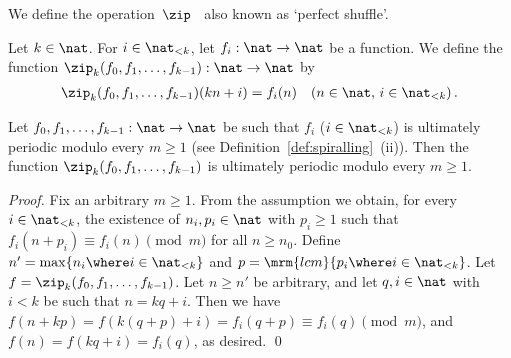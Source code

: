 We define the operation~$\zip$~\cite{grab:endr:hend:klop:moss:2012} also known as `perfect shuffle'.
 

\begin{definition}\label{def:zip}
  Let $k \in \nat$. 
  For $i \in \nat_{<k}$, 
  let $f_i : \nat \to \nat$ be a function.
  We define the function $\zip_k(f_0,f_1,\ldots,f_{k-1}) : \nat \to \nat$ by 
  \begin{align*}
    \zip_k(f_0,f_1,\ldots,f_{k-1})(kn+i) = f_i(n) && (n \in \nat,\, i \in \nat_{<k}) \,.
  \end{align*}
\end{definition}

\begin{lemma}\label{lem:zip:periodic:modulo}
  Let $f_0,f_1,\ldots,f_{k-1} : \nat \to \nat$ be 
  such that
  $f_i$ ($i \in \nat_{<k}$) is ultimately periodic modulo every $m \ge 1$ (see Definition~\ref{def:spiralling}~(ii)).
Then the function $\zip_k(f_0,f_1,\ldots,f_{k-1})$ is ultimately periodic modulo every $m \ge 1$.
\end{lemma}
\begin{proof}
  Fix an arbitrary $m \ge 1$.
  From the assumption we obtain, for every $i \in \nat_{<k}$, the existence of $n_i, p_i \in \nat$ with $p_i \ge 1$
  such that $f_i(n+p_i) \equiv f_i(n) \pmod{m}$ for all $n \ge n_0$.
  Define $n' = \max\{n_i\where i \in \nat_{<k}\}$
  and $p = \mrm{lcm} \{p_i\where i \in \nat_{<k}\}$.
  Let $f = \zip_k(f_0,f_1,\ldots,f_{k-1})$.
  Let $n \ge n'$ be arbitrary, 
  and let $q,i\in\nat$ with $i < k$ be such that $n = kq + i$.
  Then we have 
  $f(n+kp) = f(k(q+p) + i) = f_i(q+p) \equiv f_i(q) \pmod{m}$,
  and $f(n) = f(kq + i) = f_i(q)$, as desired.
  \qed
\end{proof}


